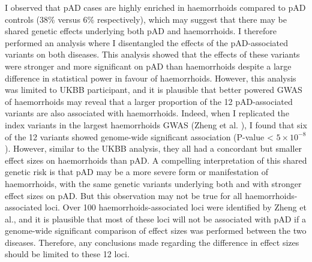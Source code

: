
I observed that pAD cases are highly enriched in haemorrhoids compared to pAD controls (38\% versus 6\% respectively), which may suggest that there may be shared genetic effects underlying both pAD and haemorrhoids. I therefore performed an analysis where I disentangled the effects of the pAD-associated variants on both diseases. This analysis showed that the effects of these variants were stronger and more significant on pAD than haemorrhoids despite a large difference in statistical power in favour of haemorrhoids. However, this analysis was limited to UKBB participant, and it is plausible that better powered GWAS of haemorrhoids may reveal that a larger proportion of the 12 pAD-associated variants are also associated with haemorrhoids. Indeed, when I replicated the index variants in the largest haemorrhoids GWAS (Zheng et al. \cite{Zheng2021-ss}), I found that six of the 12 variants showed genome-wide significant association (P-value < $5\times10^{-8}$). However, similar to the UKBB analysis, they all had a concordant but smaller effect sizes on haemorrhoids than pAD. A compelling interpretation of this shared genetic risk is that pAD may be a more severe form or manifestation of haemorrhoids, with the same genetic variants underlying both and with stronger effect sizes on pAD. But this observation may not be true for all haemorrhoids-associated loci. Over 100 haemorrhoids-associated loci were identified by Zheng et al., and it is plausible that most of these loci will not be associated with pAD if a genome-wide significant comparison of effect sizes was performed between the two diseases. Therefore, any conclusions made regarding the difference in effect sizes should be limited to these 12 loci.\\

